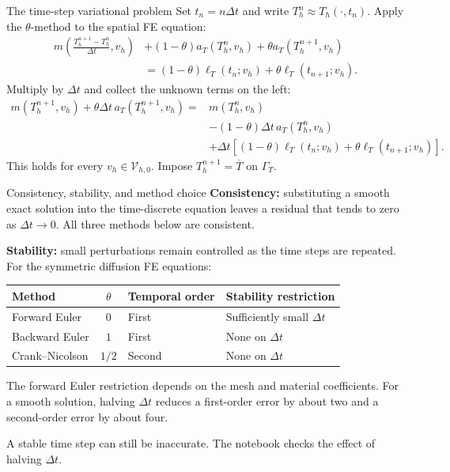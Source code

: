 \documentclass[11pt,aspectratio=169]{beamer}
\newcommand{\Vhzero}{\mathcal V_{h,0}}
\begin{document}
\begin{frame}{The time-step variational problem}
Set $t_n=n\Delta t$ and write $T_h^n\approx T_h(\cdot,t_n)$.
Apply the $\theta$-method to the spatial FE equation:
\[
\begin{aligned}
m\left(\frac{T_h^{n+1}-T_h^n}{\Delta t},v_h\right)
&+(1-\theta)a_T(T_h^n,v_h)+\theta a_T(T_h^{n+1},v_h)\\
&=(1-\theta)\ell_T(t_n;v_h)+\theta\ell_T(t_{n+1};v_h).
\end{aligned}
\]
Multiply by $\Delta t$ and collect the unknown terms on the left:
\[
\boxed{\begin{aligned}
m(T_h^{n+1},v_h)+\theta\Delta t\,a_T(T_h^{n+1},v_h)
={}&m(T_h^n,v_h)\\
&-(1-\theta)\Delta t\,a_T(T_h^n,v_h)\\
&+\Delta t[(1-\theta)\ell_T(t_n;v_h)
+\theta\ell_T(t_{n+1};v_h)].
\end{aligned}}
\]
This holds for every $v_h\in\Vhzero$.
Impose $T_h^{n+1}=\overline T$ on $\Gamma_T$.
\end{frame}

\begin{frame}{Consistency, stability, and method choice}
\textbf{Consistency:} substituting a smooth exact solution into the
time-discrete equation leaves a residual that tends to zero as $\Delta t\to0$.
All three methods below are consistent.

\medskip
\textbf{Stability:} small perturbations remain controlled as the time steps
are repeated. For the symmetric diffusion FE equations:
\begin{center}
\begin{tabular}{lcll}
\toprule
Method & $\theta$ & Temporal order & Stability restriction\\
\midrule
Forward Euler & $0$ & First & Sufficiently small $\Delta t$\\
Backward Euler & $1$ & First & None on $\Delta t$\\
Crank--Nicolson & $1/2$ & Second & None on $\Delta t$\\
\bottomrule
\end{tabular}
\end{center}
The forward Euler restriction depends on the mesh and material coefficients.
For a smooth solution, halving $\Delta t$ reduces a first-order error by about
two and a second-order error by about four.

\medskip
A stable time step can still be inaccurate. The notebook checks the effect of halving $\Delta t$.
\end{frame}
\end{document}
